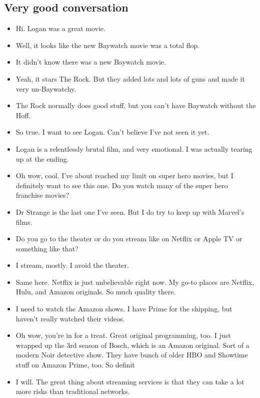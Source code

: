 \documentclass[11pt,a4paper]{article}
\begin{document}
\subsection{Very good conversation}
\begin{itemize}
\itemsep0em
\item[\ding{172}] Hi. Logan was a great movie. 
\item[\ding{173}] Well, it looks like the new Baywatch movie was a total flop.
\item[\ding{172}] It didn't know there was a new Baywatch movie. 
\item[\ding{173}] Yeah, it stars The Rock. But they added lots and lots of guns and made it very un-Baywatchy.
\item[\ding{172}] The Rock normally does good stuff, but you can't have Baywatch without the Hoff. 
\item[\ding{173}] So true. I want to see Logan. Can't believe I've not seen it yet.
\item[\ding{172}] Logan is a relentlessly brutal film, and very emotional. I was actually tearing up at the ending. 
\item[\ding{173}] Oh wow, cool.  I've about reached my limit on super hero movies, but I definitely want to see this one. Do you watch many of the super hero franchise movies?
\item[\ding{172}] Dr Strange is the last one I've seen.   But I do try to keep up with Marvel's films. 
\item[\ding{173}] Do you go to the theater or do you stream like on Netflix or Apple TV or something like that?
\item[\ding{172}] I stream, mostly. I avoid the theater. 
\item[\ding{173}] Same here. Netflix is just unbelievable right now. My go-to places are Netflix, Hulu, and Amazon originals.  So much quality there.
\item[\ding{172}] I need to watch the Amazon shows.  I have Prime for the shipping, but haven't really watched their videos. 
\item[\ding{173}] Oh wow, you're in for a treat. Great original programming, too.  I just wrapped up the 3rd season of Bosch, which is an Amazon original. Sort of a modern Noir detective show. They have bunch of older HBO and Showtime stuff on Amazon Prime, too. So definit
\item[\ding{172}] I will. The great thing about streaming services is that they can take a lot more risks than traditional networks. 

\end{itemize}
\end{document}
